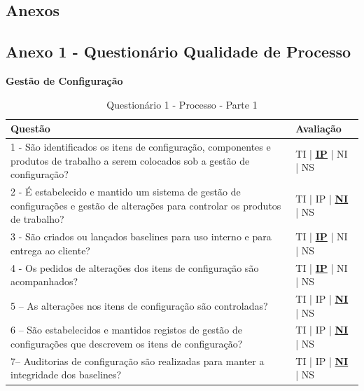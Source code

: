 \documentclass[openany,10pt,a4paper]{article}
\begin{document}
\begin{appendix}

\section*{Anexos}\label{ConteudoAnexos}

\subsection{Anexo 1 - Questionário Qualidade de Processo}\label{anexo_processo}
\begin{table}[H]
	\textbf{Gestão de Configuração}
		\centering
		\caption{Questionário 1 - Processo - Parte 1}
		\begin{tabular}{|p{5in}p{1in}|}		\hline
			\textbf{Questão}  & \textbf{Avaliação}\\ \hline
			1 - São identificados os itens de configuração, componentes e produtos de trabalho a serem 
	colocados sob a gestão de configuração?
	 & TI | \underline{\underline{\textbf{IP}}} | NI | NS \\ \hline
			2 - É estabelecido e mantido um sistema de gestão de configurações e gestão de alterações para 
	controlar os produtos de trabalho?
	 & TI | IP | \underline{\textbf{NI}} | NS \\ \hline
			3 -  São criados ou lançados baselines para uso interno e para entrega ao cliente?
	 & TI | \underline{\textbf{IP}} | NI | NS \\ \hline
			4 - Os pedidos de alterações dos itens de configuração são acompanhados?
	 & TI | \underline{\textbf{IP}} | NI | NS \\ \hline
			5 – As alterações nos itens de configuração são controladas?
	  & TI | IP | \underline{\textbf{NI}} | NS \\ \hline
			6 – São estabelecidos e mantidos registos de gestão de configurações que descrevem os itens 
	de configuração?
	 & TI | IP | \underline{\textbf{NI}} | NS \\ \hline
			7– Auditorias de configuração são realizadas para manter a integridade dos baselines?
	 & TI | IP | \underline{\textbf{NI}} | NS \\ \hline
		\end{tabular} 
	\end{table}
	

\end{appendix}
\end{document}
